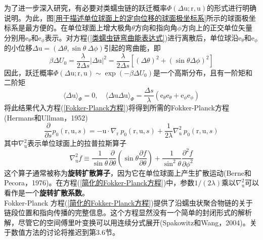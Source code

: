 为了进一步深入研究，有必要对类蠕虫链的跃迁概率$\Phi(\Delta \mathrm{u};\mathrm{r},\mathrm{u})$的形式进行明确说明。为此，图\ref{用于描述单位球面上的定向位移的球面极坐标系}所示的球面极坐标系是最方便的。在单位球面上增大极角$\theta$方向和指向角$\phi$方向上的正交单位矢量分别用$\mathrm{e}_\theta$和$\mathrm{e}_\phi$表示。对方程(\ref{类蠕虫链弯曲能表达式})进行离散后，单位球沿$\mathrm{e}_\theta$和$\mathrm{e}_\phi$的小位移$\Delta \mathrm{u}=(\Delta \theta ,\sin \theta \ \Delta \phi)$引起的弯曲能，即\\
\begin{equation}
\beta\Delta U_0 =\frac{\lambda}{2\Delta s}|\Delta \mathrm{u}|^2 =\frac{\lambda}{2\Delta s}[(\Delta\theta)^2+(\sin \theta \Delta \phi)^2]
\end{equation}
因此，跃迁概率$\Phi(\Delta \mathrm{u};\mathrm{r},\mathrm{u})\sim 
\exp(-\beta \Delta U_0)$是一个高斯分布，且有一阶矩和二阶矩\\
\begin{equation}
\langle \Delta \mathrm{u}\rangle_\Phi =0,\quad \langle \Delta \mathrm{u}\Delta \mathrm{u}\rangle_\Phi =\frac{\Delta s}{\lambda}(\mathrm{e}_\theta \mathrm{e}_\theta+\mathrm{e}_\phi \mathrm{e}_\phi)
\end{equation}
将此结果代入方程(\ref{Fokker-Planck方程})将得到所需的Fokker-Planck方程(Hermans和Ullman，1952)\\
\begin{equation}
	\frac{\partial}{\partial s}p_0(\mathrm{r},\mathrm{u},s) =-\mathrm{u} \cdot \nabla_\mathrm{r} \ p_0(\mathrm{r},\mathrm{u},s)+\frac{1}{2\lambda}\nabla_\mathrm{u}^2\  p_0(\mathrm{r},\mathrm{u},s)\label{简化的Fokker-Planck方程}
\end{equation}
其中$\nabla_\mathrm{u}^2$表示单位球面上的拉普拉斯算子\\
\begin{equation}
\nabla_\mathrm{u}^2 f \equiv \frac{1}{\sin\theta}\frac{\partial}{\partial\theta}\left(\sin\theta \frac{\partial f}{\partial \theta}\right)+\frac{1}{\sin^2\theta}\frac{\partial^2f}{\partial\phi^2}
\end{equation}
这个算子通常被称为\textbf{旋转扩散算子}，因为它在单位球面上产生扩散运动(Berne和Pecora，1976)。在方程(\ref{简化的Fokker-Planck方程})中，参数$1/(2\lambda)$乘以$\nabla_\mathrm{u}^2$可以看作是一个\textbf{旋转扩散系数}。\\

Fokker-Planck 方程(\ref{简化的Fokker-Planck方程})提供了沿蠕虫状聚合物链的关于链段位置和指向传播的完整信息。这个方程显然没有一个简单的封闭形式的解析解，尽管它的空间傅里叶变换可以用连续分式展开(Spakowitz和Wang，2004)。关于数值方法的讨论将推迟到第3.6节。\\

